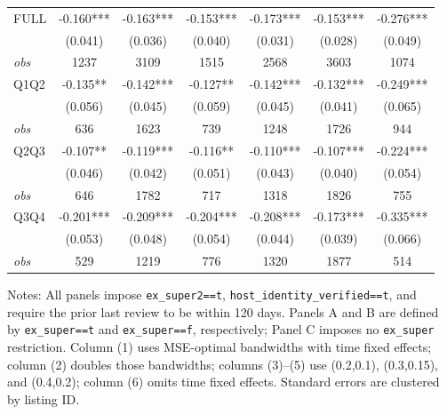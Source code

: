 \begin{table}[!htbp]
\begin{tabular}{lcccccc}
FULL & -0.160*** & -0.163*** & -0.153*** & -0.173*** & -0.153*** & -0.276*** \\
 & (0.041) & (0.036) & (0.040) & (0.031) & (0.028) & (0.049) \\
\textit{obs} & 1237 & 3109 & 1515 & 2568 & 3603 & 1074 \\
Q1Q2 & -0.135** & -0.142*** & -0.127** & -0.142*** & -0.132*** & -0.249*** \\
 & (0.056) & (0.045) & (0.059) & (0.045) & (0.041) & (0.065) \\
\textit{obs} & 636 & 1623 & 739 & 1248 & 1726 & 944 \\
Q2Q3 & -0.107** & -0.119*** & -0.116** & -0.110*** & -0.107*** & -0.224*** \\
 & (0.046) & (0.042) & (0.051) & (0.043) & (0.040) & (0.054) \\
\textit{obs} & 646 & 1782 & 717 & 1318 & 1826 & 755 \\
Q3Q4 & -0.201*** & -0.209*** & -0.204*** & -0.208*** & -0.173*** & -0.335*** \\
 & (0.053) & (0.048) & (0.054) & (0.044) & (0.039) & (0.066) \\
\textit{obs} & 529 & 1219 & 776 & 1320 & 1877 & 514 \\
\bottomrule
\end{tabular}
\begin{minipage}{0.98\textwidth}\footnotesize
Notes: All panels impose \texttt{ex\_super2==t}, \texttt{host\_identity\_verified==t}, and require the prior last review to be within 120 days. Panels A and B are defined by \texttt{ex\_super==t} and \texttt{ex\_super==f}, respectively; Panel C imposes no \texttt{ex\_super} restriction. Column (1) uses MSE-optimal bandwidths with time fixed effects; column (2) doubles those bandwidths; columns (3)--(5) use (0.2,0.1), (0.3,0.15), and (0.4,0.2); column (6) omits time fixed effects. Standard errors are clustered by listing ID.
\end{minipage}
\end{table}

